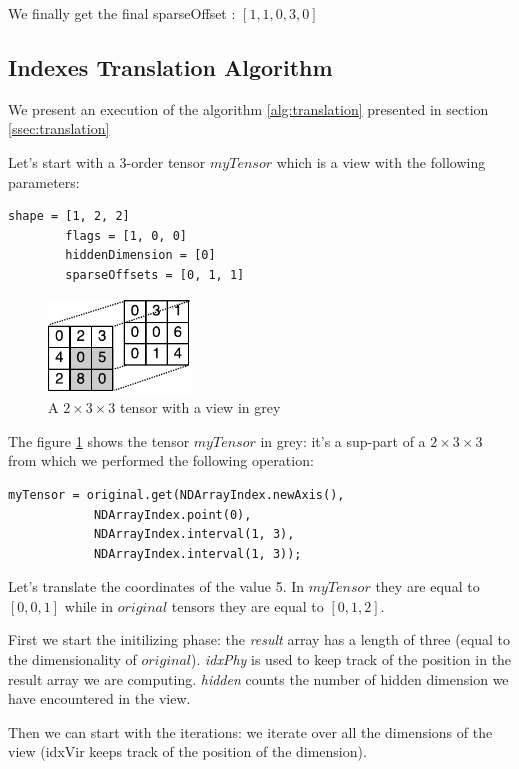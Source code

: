 	We finally get the final sparseOffset : $[1, 1, 0, 3, 0]$
	
	
\subsection{Indexes Translation Algorithm}
\label{ssec:idxtrans}
	
	We present an execution of the algorithm \ref{alg:translation} presented in section \ref{ssec:translation}
	
	Let's start with a 3-order tensor $myTensor$ which is a view with the following parameters:
		
	\begin{lstlisting}[style=nonumbers]	
		shape = [1, 2, 2]	
		flags = [1, 0, 0]
		hiddenDimension = [0]
		sparseOffsets = [0, 1, 1]
	\end{lstlisting}
	
	
	\begin{figure}[!h]
		\centering
		\includegraphics[width=1.5in]{images/apptensors.pdf}
		\caption{A $2\times 3\times 3$ tensor with a view in grey}
		\label{fig:appTensor}
	\end{figure}
	
	The figure \ref{fig:appTensor} shows the tensor $myTensor$ in grey: it's a sup-part of a $2\times 3\times 3$ from which we performed the following operation:
	
	\begin{lstlisting}[style=nonumbers]	
		myTensor = original.get(NDArrayIndex.newAxis(),
			NDArrayIndex.point(0),
			NDArrayIndex.interval(1, 3),
			NDArrayIndex.interval(1, 3));
	\end{lstlisting}

	Let's translate the coordinates of the value 5. In $myTensor$ they are equal to $[0, 0, 1]$ while in $original$ tensors they are equal to $[0, 1, 2]$.
	
	First we start the initilizing phase: the \textit{result} array has a length of three (equal to the dimensionality of $original$). \textit{idxPhy} is used to keep track of the position in the result array we are computing. \textit{hidden} counts the number of hidden dimension we have encountered in the view.
	
	Then we can start with the iterations: we iterate over all the dimensions of the view (idxVir keeps track of the position of the dimension).
	

